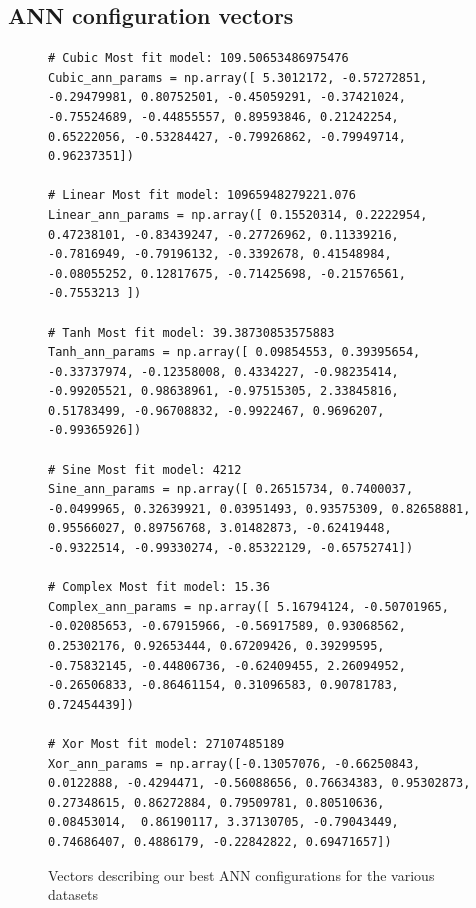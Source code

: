 \documentclass[12pt]{article}
\begin{document}
\subsection{ANN configuration vectors}\label{app:ANNconf}
\begin{figure}[h]
    \begin{verbatim}
# Cubic Most fit model: 109.50653486975476
Cubic_ann_params = np.array([ 5.3012172, -0.57272851, -0.29479981, 0.80752501, -0.45059291, -0.37421024, -0.75524689, -0.44855557, 0.89593846, 0.21242254, 0.65222056, -0.53284427, -0.79926862, -0.79949714, 0.96237351])

# Linear Most fit model: 10965948279221.076
Linear_ann_params = np.array([ 0.15520314, 0.2222954, 0.47238101, -0.83439247, -0.27726962, 0.11339216, -0.7816949, -0.79196132, -0.3392678, 0.41548984, -0.08055252, 0.12817675, -0.71425698, -0.21576561, -0.7553213 ])

# Tanh Most fit model: 39.38730853575883
Tanh_ann_params = np.array([ 0.09854553, 0.39395654, -0.33737974, -0.12358008, 0.4334227, -0.98235414, -0.99205521, 0.98638961, -0.97515305, 2.33845816, 0.51783499, -0.96708832, -0.9922467, 0.9696207, -0.99365926])

# Sine Most fit model: 4212
Sine_ann_params = np.array([ 0.26515734, 0.7400037, -0.0499965, 0.32639921, 0.03951493, 0.93575309, 0.82658881, 0.95566027, 0.89756768, 3.01482873, -0.62419448, -0.9322514, -0.99330274, -0.85322129, -0.65752741])

# Complex Most fit model: 15.36
Complex_ann_params = np.array([ 5.16794124, -0.50701965, -0.02085653, -0.67915966, -0.56917589, 0.93068562, 0.25302176, 0.92653444, 0.67209426, 0.39299595, -0.75832145, -0.44806736, -0.62409455, 2.26094952, -0.26506833, -0.86461154, 0.31096583, 0.90781783, 0.72454439])

# Xor Most fit model: 27107485189
Xor_ann_params = np.array([-0.13057076, -0.66250843, 0.0122888, -0.4294471, -0.56088656, 0.76634383, 0.95302873, 0.27348615, 0.86272884, 0.79509781, 0.80510636,  0.08453014,  0.86190117, 3.37130705, -0.79043449, 0.74686407, 0.4886179, -0.22842822, 0.69471657])

    \end{verbatim}
    \caption{Vectors describing our best ANN configurations for the various datasets}
    \label{minted:annVec}
\end{figure}
\end{document}
